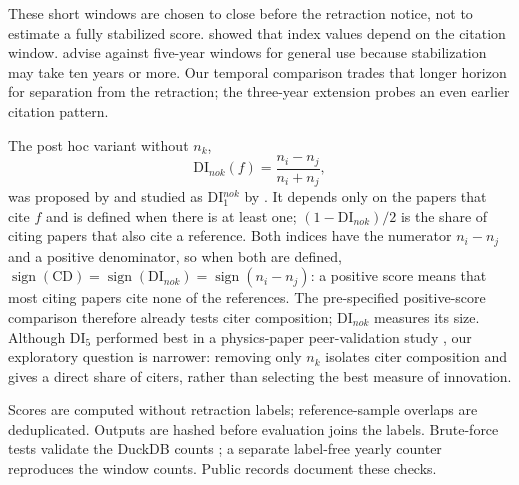 These short windows are chosen to close before the retraction notice, not to estimate a fully stabilized score.
\citet{bornmann2019window} showed that index values depend on the citation window.
\citet{lin2026displacement} advise against five-year windows for general use because stabilization may take ten
years or more. Our temporal comparison trades that longer horizon for separation from the retraction;
the three-year extension probes an even earlier citation pattern.

The post hoc variant without $n_k$,
\begin{equation}
\mathrm{DI}_{nok}(f) = \frac{n_i - n_j}{n_i + n_j},
\end{equation}
was proposed by \citet{wuyan2019solo} and studied as DI$_1^{nok}$ by \citet{bornmann2020convergent}. It depends only on
the papers that cite $f$ and is defined when there is at least one; $(1 - \mathrm{DI}_{nok})/2$ is the share of
citing papers that also cite a reference. Both indices have the numerator $n_i - n_j$ and a positive denominator, so
when both are defined, $\operatorname{sign}(\mathrm{CD}) = \operatorname{sign}(\mathrm{DI}_{nok}) =
\operatorname{sign}(n_i - n_j)$: a positive score means that most citing papers cite none of the references.
The pre-specified positive-score comparison therefore already tests citer composition; DI$_{nok}$ measures its size.
Although DI$_5$ performed best in a physics-paper peer-validation study \citep{bornmann2021milestones},
our exploratory question is narrower: removing only $n_k$ isolates citer composition and gives a direct share
of citers, rather than selecting the best measure of innovation.

Scores are computed without retraction labels; reference-sample overlaps are deduplicated.
Outputs are hashed before evaluation joins the labels. Brute-force tests validate the DuckDB counts
\citep{raasveldt2019duckdb}; a separate label-free yearly counter reproduces the window counts.
Public records document these checks.

